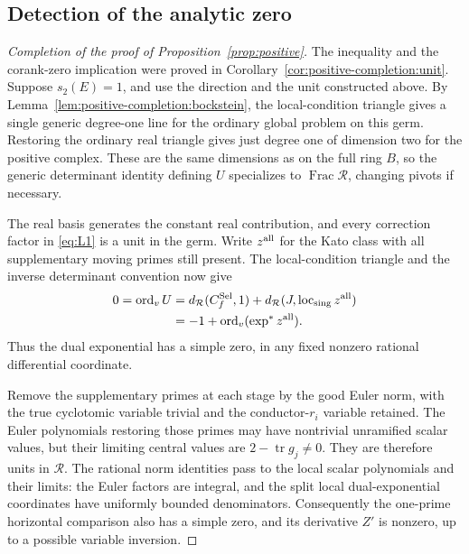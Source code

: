 \subsection{Detection of the analytic zero}

\begin{proof}[Completion of the proof of Proposition~\ref{prop:positive}]
The inequality and the corank-zero implication were proved in
Corollary~\ref{cor:positive-completion:unit}. Suppose \(s_2(E)=1\), and use
the direction and the unit constructed above.
By Lemma~\ref{lem:positive-completion:bockstein}, the local-condition
triangle gives a single generic degree-one line for the ordinary
global problem on this germ. Restoring the ordinary real triangle
gives just degree one of dimension two for the positive complex.
These are the same dimensions as on the full ring \(B\), so the
generic determinant identity defining \(U\) specializes to
\(\operatorname{Frac}\mathcal R\), changing pivots if necessary.

The real basis generates the constant real contribution, and every
correction factor in \eqref{eq:L1} is a unit in the germ. Write
\(z^{\rm all}\) for the Kato class with all supplementary moving
primes still present. The local-condition triangle and the inverse
determinant convention now give
\begin{equation}\label{eq:positive-completion:simple-exponential}
 \begin{split}
 0=\operatorname{ord}_v U
   &=d_{\mathcal R}(C_f^{\rm Sel},1)
       +d_{\mathcal R}(J,\operatorname{loc}_{\rm sing}z^{\rm all})\\
   &=-1+\operatorname{ord}_v(\exp^*z^{\rm all}).
 \end{split}
\end{equation}
Thus the dual exponential has a simple zero, in any fixed nonzero
rational differential coordinate.

Remove the supplementary primes at each stage by the good Euler norm,
with the true cyclotomic variable trivial and the conductor-\(r_i\)
variable retained. The Euler polynomials restoring those primes may
have nontrivial unramified scalar values, but their limiting central
values are \(2-\operatorname{tr}g_j\ne0\). They are therefore units in
\(\mathcal R\). The rational norm identities pass to the local scalar
polynomials and their limits: the Euler factors are integral, and the
split local dual-exponential coordinates have uniformly bounded
denominators. Consequently the one-prime horizontal comparison also
has a simple zero, and its derivative \(Z'\) is nonzero, up to a
possible variable inversion.


\end{proof}
